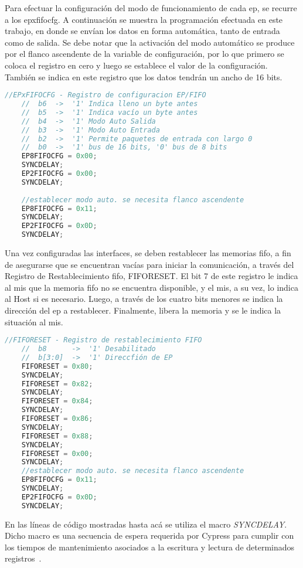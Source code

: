 	Para efectuar la configuración del modo de funcionamiento de cada \acrshort{ep}, se recurre a los \acrfull{epxfifocfg}. A continuación se muestra la programación efectuada en este trabajo, en donde se envían los datos en forma automática, tanto de entrada como de salida. Se debe notar que la activación del modo automático se produce por el flanco ascendente de la variable de configuración, por lo que primero se coloca el registro en cero y luego se establece el valor de la configuración. También se indica en este registro que los datos tendrán un ancho de 16 bits.
	
	\begin{lstlisting}[language=C,backgroundcolor=\color{gray!30}]
	//EPxFIFOCFG - Registro de configuracion EP/FIFO
	//	b6	->	'1' Indica lleno un byte antes
	//	b5	->	'1' Indica vacío un byte antes
	//	b4	->	'1' Modo Auto Salida
	//	b3	->	'1' Modo Auto Entrada
	//	b2	->	'1' Permite paquetes de entrada con largo 0
	//	b0	->	'1' bus de 16 bits, '0' bus de 8 bits
	EP8FIFOCFG = 0x00;
	SYNCDELAY;
	EP2FIFOCFG = 0x00;
	SYNCDELAY;
	
	//establecer modo auto. se necesita flanco ascendente
	EP8FIFOCFG = 0x11;
	SYNCDELAY;
	EP2FIFOCFG = 0x0D;
	SYNCDELAY;
	\end{lstlisting}
	
	Una vez configuradas las interfaces, se deben restablecer las memorias \acrshort{fifo}, a fin de asegurarse que se encuentran vacías para iniciar la comunicación, a través del Registro de Restablecimiento \acrshort{fifo}, FIFORESET. El bit 7 de este registro le indica al \acrshort{mis} que la memoria \acrshort{fifo} no se encuentra disponible, y el \acrshort{mis}, a su vez, lo indica al Host si es necesario. Luego, a través de los cuatro bits menores se indica la dirección del \acrshort{ep} a restablecer. Finalmente, libera la memoria y se le indica la situación al \acrshort{mis}.
	
	\begin{lstlisting}[language=C,backgroundcolor=\color{gray!30}]
	//FIFORESET - Registro de restablecimiento FIFO
	//	b8		->	'1' Desabilitado
	//	b[3:0]	->	'1' Direccfión de EP
	FIFORESET = 0x80;
	SYNCDELAY;
	FIFORESET = 0x82;
	SYNCDELAY;
	FIFORESET = 0x84;
	SYNCDELAY;
	FIFORESET = 0x86;
	SYNCDELAY;
	FIFORESET = 0x88;
	SYNCDELAY;
	FIFORESET = 0x00;
	SYNCDELAY;
	//establecer modo auto. se necesita flanco ascendente
	EP8FIFOCFG = 0x11;
	SYNCDELAY;
	EP2FIFOCFG = 0x0D;
	SYNCDELAY;
	\end{lstlisting}
	

	En las líneas de código mostradas hasta acá se utiliza el macro {\it SYNCDELAY}. Dicho macro es una secuencia de espera requerida por Cypress para cumplir con los tiempos de mantenimiento asociados a la escritura y lectura de determinados registros~\cite{CypressSemiconductor2014fx2lp}.%
